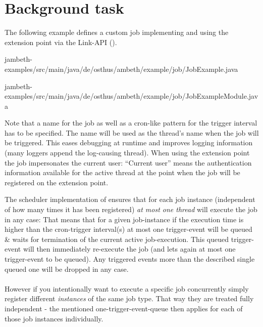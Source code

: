 \section{Background task}
\label{feature:BackgroundTask}
\ClearAPI
The following example defines a custom job implementing  and using the extension point  via the Link-API ().

{jambeth-examples/src/main/java/de/osthus/ambeth/example/job/JobExample.java}

{jambeth-examples/src/main/java/de/osthus/ambeth/example/job/JobExampleModule.java}

Note that a name for the job as well as a cron-like pattern for the trigger interval has to be specified. The name will be used as the thread's name when the job will be triggered. This eases debugging at runtime and improves logging information (many loggers append the log-causing thread). When using the extension point the job impersonates the current user: ``Current user'' means the authentication information available for the active thread at the point when the job will be registered on the extension point.


The scheduler implementation of \AMBETH{} ensures that for each job instance (independent of how many times it has been registered) \emph{at most one thread} will execute the job in any case: That means that for a given job-instance if the execution time is higher than the cron-trigger interval(s) at most one trigger-event will be queued \& waits for termination of the current active job-execution. This queued trigger-event will then immediately re-execute the job (and lets again at most one trigger-event to be queued). Any triggered events more than the described single queued one will be dropped in any case.\\\\

However if you intentionally want to execute a specific job concurrently simply register different \emph{instances} of the same job type. That way they are treated fully independent - the mentioned one-trigger-event-queue then applies for each of those job instances individually.